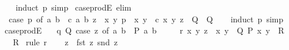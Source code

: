 \begin{isabellebody}
%
\isadelimproof
\ \ %
\endisadelimproof
%
\isatagproof
{}\isamarkupfalse%
\ {\isacharparenleft}{\kern0pt}induct\ p{\isacharparenright}{\kern0pt}\ simp%
\endisatagproof
{\isafoldproof}%
%
\isadelimproof
\isanewline
%
\endisadelimproof
\isanewline
{}\isamarkupfalse%
\ case{\isacharunderscore}{\kern0pt}prodE{\isacharprime}{\kern0pt}\ {\isacharbrackleft}{\kern0pt}elim{\isacharbang}{\kern0pt}{\isacharbrackright}{\kern0pt}{\isacharcolon}{\kern0pt}\isanewline
\ \ {\isachardoublequoteopen}{\isacharparenleft}{\kern0pt}case\ p\ of\ {\isacharparenleft}{\kern0pt}a{\isacharcomma}{\kern0pt}\ b{\isacharparenright}{\kern0pt}\ {\isasymRightarrow}\ c\ a\ b{\isacharparenright}{\kern0pt}\ z\ {\isasymLongrightarrow}\ {\isacharparenleft}{\kern0pt}{\isasymAnd}x\ y{\isachardot}{\kern0pt}\ p\ {\isacharequal}{\kern0pt}\ {\isacharparenleft}{\kern0pt}x{\isacharcomma}{\kern0pt}\ y{\isacharparenright}{\kern0pt}\ {\isasymLongrightarrow}\ c\ x\ y\ z\ {\isasymLongrightarrow}\ Q{\isacharparenright}{\kern0pt}\ {\isasymLongrightarrow}\ Q{\isachardoublequoteclose}\isanewline
%
\isadelimproof
\ \ %
\endisadelimproof
%
\isatagproof
{}\isamarkupfalse%
\ {\isacharparenleft}{\kern0pt}induct\ p{\isacharparenright}{\kern0pt}\ simp%
\endisatagproof
{\isafoldproof}%
%
\isadelimproof
\isanewline
%
\endisadelimproof
\isanewline
{}\isamarkupfalse%
\ case{\isacharunderscore}{\kern0pt}prodE{}{\isacharcolon}{\kern0pt}\isanewline
\ \ \ q{\isacharcolon}{\kern0pt}\ {\isachardoublequoteopen}Q\ {\isacharparenleft}{\kern0pt}case\ z\ of\ {\isacharparenleft}{\kern0pt}a{\isacharcomma}{\kern0pt}\ b{\isacharparenright}{\kern0pt}\ {\isasymRightarrow}\ P\ a\ b{\isacharparenright}{\kern0pt}{\isachardoublequoteclose}\isanewline
\ \ \ \ \ r{\isacharcolon}{\kern0pt}\ {\isachardoublequoteopen}{\isasymAnd}x\ y{\isachardot}{\kern0pt}\ z\ {\isacharequal}{\kern0pt}\ {\isacharparenleft}{\kern0pt}x{\isacharcomma}{\kern0pt}\ y{\isacharparenright}{\kern0pt}\ {\isasymLongrightarrow}\ Q\ {\isacharparenleft}{\kern0pt}P\ x\ y{\isacharparenright}{\kern0pt}\ {\isasymLongrightarrow}\ R{\isachardoublequoteclose}\isanewline
\ \ \ R\isanewline
%
\isadelimproof
%
\endisadelimproof
%
\isatagproof
{}\isamarkupfalse%
\ {\isacharparenleft}{\kern0pt}rule\ r{\isacharparenright}{\kern0pt}\isanewline
\ \ \isamarkupfalse%
\ {\isachardoublequoteopen}z\ {\isacharequal}{\kern0pt}\ {\isacharparenleft}{\kern0pt}fst\ z{\isacharcomma}{\kern0pt}\ snd\ z{\isacharparenright}{\kern0pt}{\isachardoublequoteclose}\ \isamarkupfalse%

\end{isabellebody}
